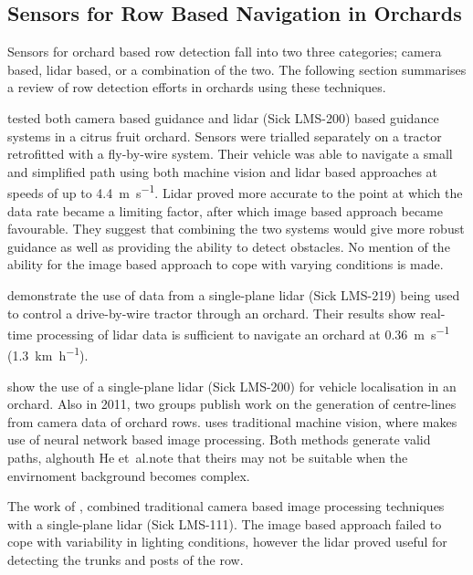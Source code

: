 \documentclass[preprint,authoryear,12pt]{elsarticle}
\begin{document}
    \subsection{Sensors for Row Based Navigation in Orchards}

        Sensors for orchard based row detection fall into two three categories; camera based, lidar based, or a combination of the two.
        The following section summarises a review of row detection efforts in orchards using these techniques.

        \cite{Subramanian2006} tested both camera based guidance and lidar (Sick LMS-200) based guidance systems in a citrus fruit orchard.
        Sensors were trialled separately on a tractor retrofitted with a fly-by-wire system.
        Their vehicle was able to navigate a small and simplified path using both machine vision and lidar based approaches at speeds of up to \SI{4.4}{\meter\per\second}.
        Lidar proved more accurate to the point at which the data rate became a limiting factor, after which image based approach became favourable.
        They suggest that combining the two systems would give more robust guidance as well as providing the ability to detect obstacles.
        No mention of the ability for the image based approach to cope with varying conditions is made.

        \cite{Barawid2007} demonstrate the use of data from a single-plane lidar (Sick LMS-219) being used to control a drive-by-wire tractor through an orchard.
        Their results show real-time processing of lidar data is sufficient to navigate an orchard at \SI{0.36}{\meter\per\second} (\SI{1.3}{\kilo\meter\per\hour}).

        \cite{Hansen2011} show the use of a single-plane lidar (Sick LMS-200) for vehicle localisation in an orchard.
        Also in 2011, two groups publish work on the generation of centre-lines from camera data of orchard rows.
        \cite{He2011} uses traditional machine vision, where \cite{Torres2011} makes use of neural network based image processing.
        Both methods generate valid paths, alghouth He et~al.\@ note that theirs may not be suitable when the envirnoment background becomes complex.

        The work of \cite{Scarfe2012}, combined traditional camera based image processing techniques with a single-plane lidar (Sick LMS-111).
        The image based approach failed to cope with variability in lighting conditions, however the lidar proved useful for detecting the trunks and posts of the row.
\end{document}
